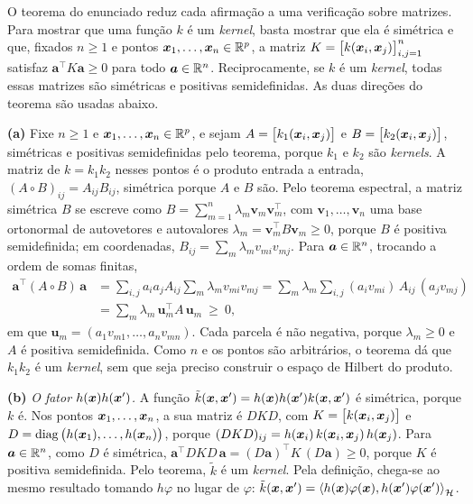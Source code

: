 \begin{solucao}
O teorema do enunciado reduz cada afirmação a uma verificação sobre matrizes. Para mostrar que
uma função $k$ é um \emph{kernel}, basta mostrar que ela é simétrica e que, fixados $n\ge1$ e
pontos $\bm{x}_1,\dots,\bm{x}_n\in\mathbb{R}^p$, a matriz $K=\big[k(\bm{x}_i,\bm{x}_j)\big]_{i,j=1}^n$ satisfaz
$\bm a^\top K\bm a\ge0$ para todo $\bm a\in\mathbb{R}^n$. Reciprocamente, se $k$ é um \emph{kernel},
todas essas matrizes são simétricas e positivas semidefinidas. As duas direções do teorema são
usadas abaixo.

\smallskip
\textbf{(a)} Fixe $n\ge1$ e $\bm{x}_1,\dots,\bm{x}_n\in\mathbb{R}^p$, e sejam $A=\big[k_1(\bm{x}_i,\bm{x}_j)\big]$ e
$B=\big[k_2(\bm{x}_i,\bm{x}_j)\big]$, simétricas e positivas semidefinidas pelo teorema, porque $k_1$ e
$k_2$ são \emph{kernels}. A matriz de $k=k_1k_2$ nesses pontos é o produto entrada a entrada,
$(A\circ B)_{ij}=A_{ij}B_{ij}$, simétrica porque $A$ e $B$ são. Pelo teorema espectral, a
matriz simétrica $B$ se escreve como $B=\sum_{m=1}^n\lambda_m\bm v_m\bm v_m^\top$, com
$\bm v_1,\dots,\bm v_n$ uma base ortonormal de autovetores e autovalores
$\lambda_m=\bm v_m^\top B\bm v_m\ge0$, porque $B$ é positiva semidefinida; em coordenadas,
$B_{ij}=\sum_m\lambda_mv_{mi}v_{mj}$. Para $\bm a\in\mathbb{R}^n$, trocando a ordem de somas finitas,
\begin{align*}
  \bm a^\top(A\circ B)\,\bm a
  &=\sum_{i,j}a_ia_jA_{ij}\sum_m\lambda_mv_{mi}v_{mj}
   =\sum_m\lambda_m\sum_{i,j}(a_iv_{mi})\,A_{ij}\,(a_jv_{mj})\\
  &=\sum_m\lambda_m\,\bm u_m^\top A\,\bm u_m\ \ge\ 0,
\end{align*}
em que $\bm u_m=(a_1v_{m1},\dots,a_nv_{mn})$. Cada parcela é não negativa, porque $\lambda_m\ge0$
e $A$ é positiva semidefinida. Como $n$ e os pontos são arbitrários, o teorema dá que $k_1k_2$ é
um \emph{kernel}, sem que seja preciso construir o espaço de Hilbert do produto.

\smallskip
\textbf{(b)} \emph{O fator $h(\bm{x})h(\bm{x}')$.} A função $\tilde k(\bm{x},\bm{x}')=h(\bm{x})h(\bm{x}')k(\bm{x},\bm{x}')$ é
simétrica, porque $k$ é. Nos pontos $\bm{x}_1,\dots,\bm{x}_n$, a sua matriz é $DKD$, com
$K=\big[k(\bm{x}_i,\bm{x}_j)\big]$ e $D=\operatorname{diag}\big(h(\bm{x}_1),\dots,h(\bm{x}_n)\big)$, porque
$(DKD)_{ij}=h(\bm{x}_i)\,k(\bm{x}_i,\bm{x}_j)\,h(\bm{x}_j)$. Para $\bm a\in\mathbb{R}^n$, como $D$ é simétrica,
$\bm a^\top DKD\,\bm a=(D\bm a)^\top K\,(D\bm a)\ge0$, porque $K$ é positiva semidefinida. Pelo
teorema, $\tilde k$ é um \emph{kernel}. Pela definição, chega-se ao mesmo resultado tomando
$h\varphi$ no lugar de $\varphi$:
$\tilde k(\bm{x},\bm{x}')=\left\langle h(\bm{x})\varphi(\bm{x}), h(\bm{x}')\varphi(\bm{x}') \right\rangle_{\mathcal H}$.


\end{solucao}
